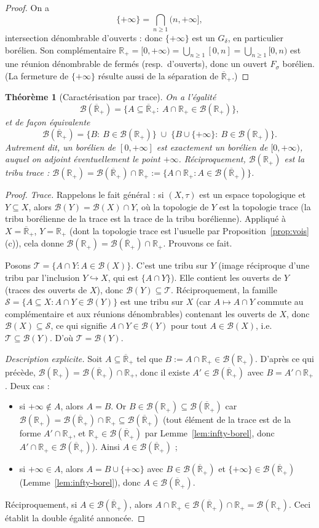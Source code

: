 \documentclass[11pt,a4paper]{article}
\theoremstyle{plain}
\newtheorem{theorem}{Théorème}[section]
\theoremstyle{definition}
\newcommand{\Rp}{\mathbb{R}_+}
\newcommand{\Rpb}{\overline{\mathbb{R}}_+}
\newcommand{\B}{\mathcal{B}}
\begin{document}
\begin{proof}
On a
\[
\{+\infty\}=\bigcap_{n\ge1}(n,+\infty],
\]
intersection dénombrable d'ouverts : donc $\{+\infty\}$ est un $G_\delta$, en
particulier borélien. Son complémentaire
$\Rp=[0,+\infty)=\bigcup_{n\ge1}[0,n]=\bigcup_{n\ge1}[0,n)$ est une réunion
dénombrable de fermés (resp.\ d'ouverts), donc un ouvert $F_\sigma$ borélien.
(La fermeture de $\{+\infty\}$ résulte aussi de la séparation de $\Rpb$.)
\end{proof}

\begin{theorem}[Caractérisation par trace]\label{thm:trace}
On a l'égalité
\[
\B(\Rpb)=\Big\{A\subseteq\Rpb:\ A\cap\Rp\in\B(\Rp)\Big\},
\]
et de façon équivalente
\[
\B(\Rpb)=\Big\{B:\ B\in\B(\Rp)\Big\}\;\cup\;\Big\{B\cup\{+\infty\}:\ B\in\B(\Rp)\Big\}.
\]
Autrement dit, un borélien de $[0,+\infty]$ est exactement un borélien de
$[0,+\infty)$, auquel on adjoint éventuellement le point $+\infty$.
Réciproquement, $\B(\Rp)$ est la tribu trace : $\B(\Rp)=\B(\Rpb)\cap\Rp
:=\{A\cap\Rp:A\in\B(\Rpb)\}$.
\end{theorem}

\begin{proof}
\emph{Trace.} Rappelons le fait général : si $(X,\tau)$ est un espace
topologique et $Y\subseteq X$, alors $\B(Y)=\B(X)\cap Y$, où la topologie de $Y$
est la topologie trace (la tribu borélienne de la trace est la trace de la
tribu borélienne). Appliqué à $X=\Rpb$, $Y=\Rp$ (dont la topologie trace est
l'usuelle par Proposition~\ref{prop:vois}(c)), cela donne
$\B(\Rp)=\B(\Rpb)\cap\Rp$. Prouvons ce fait.

Posons $\mathcal{T}=\{A\cap Y:A\in\B(X)\}$. C'est une tribu sur $Y$ (image
réciproque d'une tribu par l'inclusion $Y\hookrightarrow X$, qui est
$\{A\cap Y\}$). Elle contient les ouverts de $Y$ (traces des ouverts de $X$),
donc $\B(Y)\subseteq\mathcal{T}$. Réciproquement, la famille
$\mathcal{S}=\{A\subseteq X: A\cap Y\in\B(Y)\}$ est une tribu sur $X$ (car
$A\mapsto A\cap Y$ commute au complémentaire et aux réunions dénombrables)
contenant les ouverts de $X$, donc $\B(X)\subseteq\mathcal{S}$, ce qui signifie
$A\cap Y\in\B(Y)$ pour tout $A\in\B(X)$, i.e.\ $\mathcal{T}\subseteq\B(Y)$. D'où
$\mathcal{T}=\B(Y)$.

\emph{Description explicite.} Soit $A\subseteq\Rpb$ tel que
$B:=A\cap\Rp\in\B(\Rp)$. D'après ce qui précède, $\B(\Rp)=\B(\Rpb)\cap\Rp$, donc
il existe $A'\in\B(\Rpb)$ avec $B=A'\cap\Rp$. Deux cas :
\begin{itemize}[nosep]
\item si $+\infty\notin A$, alors $A=B$. Or $B\in\B(\Rp)\subseteq\B(\Rpb)$ car
$\B(\Rp)=\B(\Rpb)\cap\Rp\subseteq\B(\Rpb)$ (tout élément de la trace est de la
forme $A'\cap\Rp$, et $\Rp\in\B(\Rpb)$ par Lemme~\ref{lem:infty-borel}, donc
$A'\cap\Rp\in\B(\Rpb)$). Ainsi $A\in\B(\Rpb)$ ;
\item si $+\infty\in A$, alors $A=B\cup\{+\infty\}$ avec $B\in\B(\Rpb)$ et
$\{+\infty\}\in\B(\Rpb)$ (Lemme~\ref{lem:infty-borel}), donc
$A\in\B(\Rpb)$.
\end{itemize}
Réciproquement, si $A\in\B(\Rpb)$, alors $A\cap\Rp\in\B(\Rpb)\cap\Rp=\B(\Rp)$.
Ceci établit la double égalité annoncée.
\end{proof}
\end{document}
